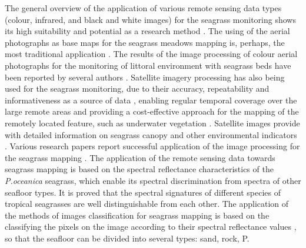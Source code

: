 \documentclass[10pt, a4paper]{article}
\begin{document}
The general overview of the application of various remote sensing data types (colour,
infrared, and black and white images) for the seagrass monitoring shows its high suitability and
potential as a research method \cite{Pasqualini01,Matarrese06}\label{Pasqualini01}\label{Matarrese06}. The using of the aerial
photographs as base maps for the seagrass meadows mapping is, perhaps, the most traditional
application \cite{McKenzie03,Kendrick00,Pasqualini99}\label{McKenzie03} \label{Kendrick00} \label{Pasqualini99}. The results of the image
processing of colour aerial photographs for the monitoring of littoral environment with seagrass beds
have been reported by several authors \cite{Kelly80,Walker89,Green96}\label{Kelly80} \label{Walker89} \label{Green96}.
Satellite imagery processing has also being used for the seagrass monitoring, due to their accuracy,
repeatability and informativeness as a source of data \cite{Dekker05b}\label{Dekker05b}, enabling regular temporal
coverage over the large remote areas and providing a cost-effective approach for the mapping of the
remotely located feature, such as underwater vegetation \cite{Jensen95}\label{Jensen95}. Satellite images provide
with detailed information on seagrass canopy and other environmental indicators \cite{Fyfe03}\label{Fyfe03}.
Various research papers report successful application of the image processing for the
seagrass mapping \cite{Calvo03,Dekker05a,Fornes06,Green96,Jackson07,Jensen95,Kendrick00,Lyzenga81,Malthus03,Matarrese08,Mount03,Pasqualini01,Pasqualini99,Pasqualini98a,Pergent-Martini06,Ralph05,Ribed02,Short01,Walker89}\label{Calvo03}\label{Dekker05a}\label{Fornes06}\label{Green96}\label{Jackson07}\label{Jensen95}\label{Kendrick00} \label{Lyzenga81}\label{Malthus03}\label{Matarrese08}\label{Mount03}\label{Pasqualini01}\label{Pasqualini99}\label{Pasqualini98a}\label{Pergent-Martini06}\label{Ralph05}\label{Ribed02}\label{Short01}\label{Walker89}. The application of the remote sensing data towards seagrass mapping is based on the spectral reflectance
 characteristics of the \textit{P.oceanica} seagrass, which enable its spectral discrimination from spectra of other seafloor types. 
It is proved \cite{Thorhaug07} \label{Thorhaug07} that the spectral signatures of different species of tropical seagrasses are well
distinguishable from each other. The application of the methods of images classification for seagrass
mapping is based on the classifying the pixels on the image according to their spectral reflectance
values \cite{Fornes06} \label{Fornes06}, so that the seafloor can be divided into several types: sand, rock, P.
\end{document}
